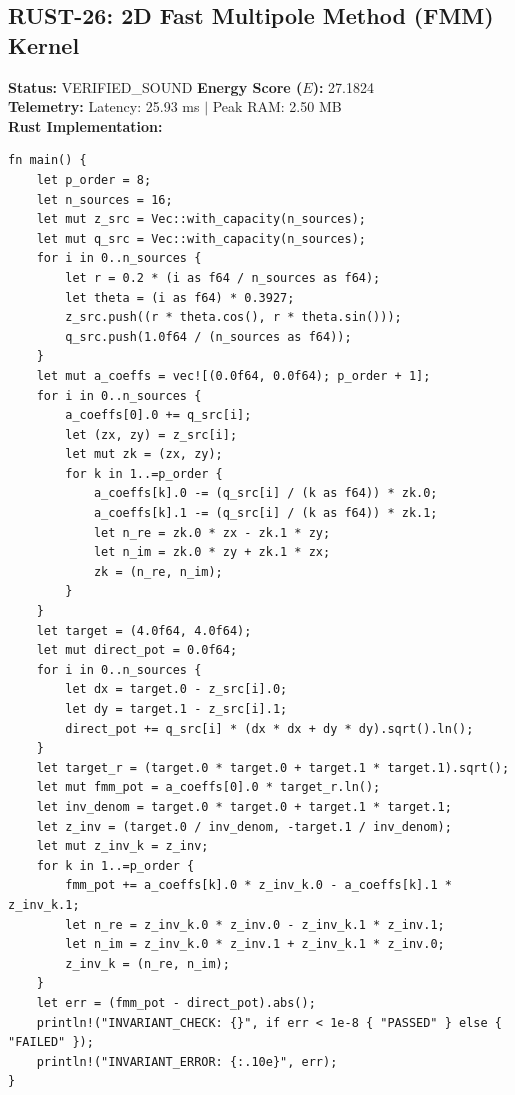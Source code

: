 \documentclass[11pt, a4paper]{article}
\begin{document}
\subsection{RUST-26: 2D Fast Multipole Method (FMM) Kernel}
\textbf{Status:} VERIFIED\_SOUND \hfill \textbf{Energy Score ($E$):} 27.1824\\
\textbf{Telemetry:} Latency: 25.93 ms $|$ Peak RAM: 2.50 MB\\
\textbf{Rust Implementation:}
\begin{verbatim}
fn main() {
    let p_order = 8;
    let n_sources = 16;
    let mut z_src = Vec::with_capacity(n_sources);
    let mut q_src = Vec::with_capacity(n_sources);
    for i in 0..n_sources {
        let r = 0.2 * (i as f64 / n_sources as f64);
        let theta = (i as f64) * 0.3927;
        z_src.push((r * theta.cos(), r * theta.sin()));
        q_src.push(1.0f64 / (n_sources as f64));
    }
    let mut a_coeffs = vec![(0.0f64, 0.0f64); p_order + 1];
    for i in 0..n_sources {
        a_coeffs[0].0 += q_src[i];
        let (zx, zy) = z_src[i];
        let mut zk = (zx, zy);
        for k in 1..=p_order {
            a_coeffs[k].0 -= (q_src[i] / (k as f64)) * zk.0;
            a_coeffs[k].1 -= (q_src[i] / (k as f64)) * zk.1;
            let n_re = zk.0 * zx - zk.1 * zy;
            let n_im = zk.0 * zy + zk.1 * zx;
            zk = (n_re, n_im);
        }
    }
    let target = (4.0f64, 4.0f64);
    let mut direct_pot = 0.0f64;
    for i in 0..n_sources {
        let dx = target.0 - z_src[i].0;
        let dy = target.1 - z_src[i].1;
        direct_pot += q_src[i] * (dx * dx + dy * dy).sqrt().ln();
    }
    let target_r = (target.0 * target.0 + target.1 * target.1).sqrt();
    let mut fmm_pot = a_coeffs[0].0 * target_r.ln();
    let inv_denom = target.0 * target.0 + target.1 * target.1;
    let z_inv = (target.0 / inv_denom, -target.1 / inv_denom);
    let mut z_inv_k = z_inv;
    for k in 1..=p_order {
        fmm_pot += a_coeffs[k].0 * z_inv_k.0 - a_coeffs[k].1 * z_inv_k.1;
        let n_re = z_inv_k.0 * z_inv.0 - z_inv_k.1 * z_inv.1;
        let n_im = z_inv_k.0 * z_inv.1 + z_inv_k.1 * z_inv.0;
        z_inv_k = (n_re, n_im);
    }
    let err = (fmm_pot - direct_pot).abs();
    println!("INVARIANT_CHECK: {}", if err < 1e-8 { "PASSED" } else { "FAILED" });
    println!("INVARIANT_ERROR: {:.10e}", err);
}
\end{verbatim}
\end{document}
